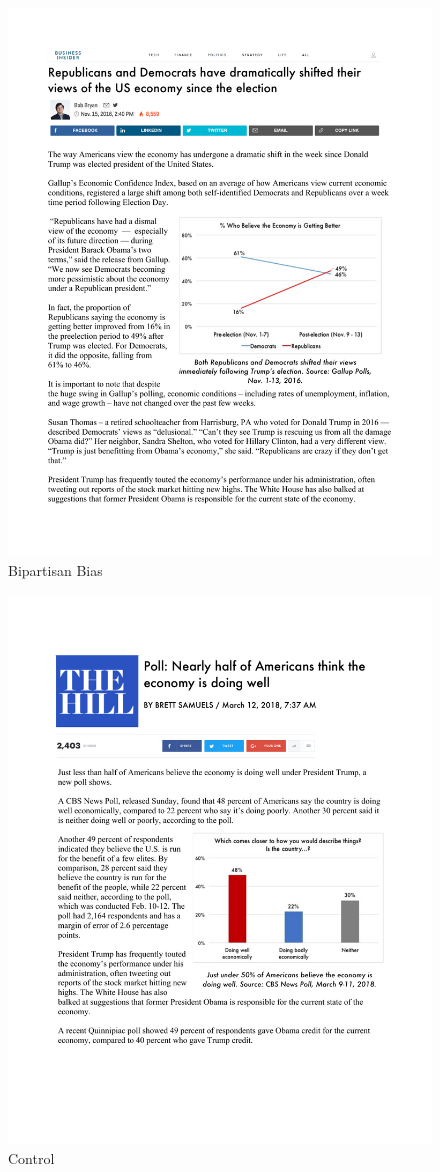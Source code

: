 \documentclass[12pt, letterpaper]{article}
\begin{document}
\begin{figure}[H]
\centering
{}
\caption{Bipartisan Bias}
\includegraphics[width=1.05\textwidth]{../figs/yg_treats/bipart_motivate.pdf}
\smallskip
\end{figure}

\begin{figure}[H]
\centering
{}
\caption{Control}
\includegraphics[width=1.05\textwidth]{../figs/yg_treats/control.pdf}
\smallskip
\end{figure}
\end{document}
